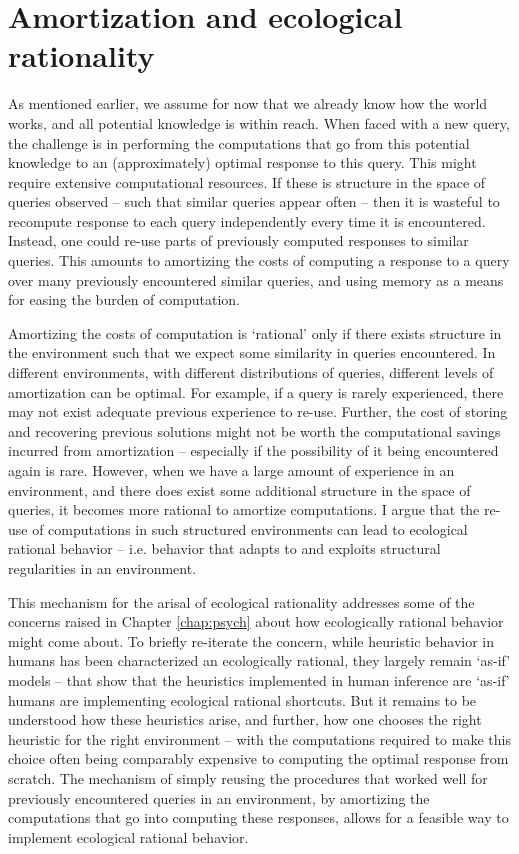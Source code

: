 \section{Amortization and ecological rationality}

As mentioned earlier, we assume for now that we already know how the world works, and all potential knowledge is within reach. When faced with a new query, the challenge is in performing the computations that go from this potential knowledge to an (approximately) optimal response to this query. This might require extensive computational resources. If these is structure in the space of queries observed -- such that similar queries appear often -- then it is wasteful to recompute response to each query independently every time it is encountered. Instead, one could re-use parts of previously computed responses to similar queries. This amounts to amortizing the costs of computing a response to a query over many previously encountered similar queries, and using memory as a means for easing the burden of computation.

Amortizing the costs of computation is `rational' only if there exists structure in the environment  such that we expect some similarity in queries encountered. In different environments, with different distributions of queries, different levels of amortization can be optimal. For example, if a query is rarely experienced, there may not exist adequate previous experience to re-use. Further, the cost of storing and recovering previous solutions might not be worth the computational savings incurred from amortization -- especially if the possibility of it being encountered again is rare. However, when we have a large amount of experience in an environment, and there does exist some additional structure in the space of queries, it becomes more rational to amortize computations. I argue that the re-use of computations in such structured environments can lead to ecological rational behavior -- i.e. behavior that adapts to and exploits structural regularities in an environment. 

This mechanism for the arisal of ecological rationality addresses some of the concerns raised in Chapter \ref{chap:psych} about how ecologically rational behavior might come about. To briefly re-iterate the concern, while heuristic behavior in humans has been characterized an ecologically rational\cite{gigerenzer2008heuristics}, they largely remain `as-if' models -- that show that the heuristics implemented in human inference are `as-if' humans are implementing ecological rational shortcuts. But it remains to be understood how these heuristics arise, and further, how one chooses the right heuristic for the right environment -- with the computations required to make this choice often being comparably expensive to computing the optimal response from scratch\cite{lieder2017strategy}. The mechanism of simply reusing the procedures that worked well for previously encountered queries in an environment, by amortizing the computations that go into computing these responses, allows for a feasible way to implement ecological rational behavior. 

